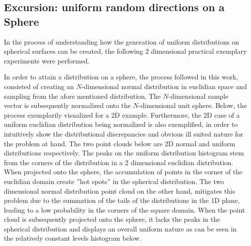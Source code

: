\subsection{Excursion: uniform random directions on a Sphere}

In the process of understanding how the generation of uniform distributions on
spherical surfaces can be created, the following 2 dimensional practical exemplary
experiments were performed.

In order to attain a distribution on a sphere, the process followed in this work,
consisted of creating an $N$-dimensional normal distribution in euclidian space and
sampling from the afore mentioned distribution.  The $N$-dimensional sample vector
is subsequently normalized onto the $N$-dimensional unit sphere.  Below, the process
exemplarily visualized for a 2D example.  Furthermore, the 2D case of a uniform
euclidian distribution being normalized is also exemplified, in order to intuitively
show the distributional discrepancies and obvious ill suited nature for the problem
at hand.  The two point clouds below are 2D normal and uniform distributions
respectively.  The peaks on the uniform distribution histogram stem from the corners
of the distribution in a 2 dimensional euclidian distribution.  When projected onto
the sphere, the accumulation of points in the corner of the euclidian domain create
''hot spots'' in the spherical distribution.  The two dimensional normal
distribution point cloud on the other hand, mitigates this problem due to the summation
of the tails of the distributions in the 1D plane, leading to a low probability
in the corners of the square domain.  When the point cloud  is subsequently projected
onto the sphere, it lacks the peaks in the  spherical distribution and displays an
overall uniform nature as can be seen in the relatively constant levels  histogram below.
